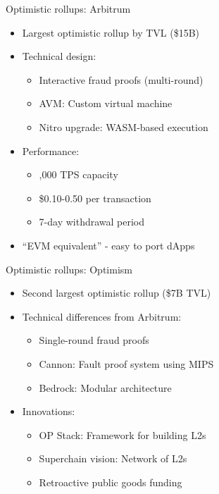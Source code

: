 \documentclass[aspectratio=169, lualatex, handout]{beamer}
\begin{document}
\begin{frame}{Optimistic rollups: Arbitrum}
	\begin{itemize}
		\item Largest optimistic rollup by TVL (\approx\$15B)
		\item Technical design:
		      \begin{itemize}
			      \item Interactive fraud proofs (multi-round)
			      \item AVM: Custom virtual machine
			      \item Nitro upgrade: WASM-based execution
		      \end{itemize}
		\item Performance:
		      \begin{itemize}
			      \item {},000 TPS capacity
			      \item \approx\$0.10-0.50 per transaction
			      \item 7-day withdrawal period
		      \end{itemize}
		\item ``EVM equivalent'' - easy to port dApps
	\end{itemize}
\end{frame}

\begin{frame}{Optimistic rollups: Optimism}
	\begin{itemize}
		\item Second largest optimistic rollup (\approx\$7B TVL)
		\item Technical differences from Arbitrum:
		      \begin{itemize}
			      \item Single-round fraud proofs
			      \item Cannon: Fault proof system using MIPS
			      \item Bedrock: Modular architecture
		      \end{itemize}
		\item Innovations:
		      \begin{itemize}
			      \item OP Stack: Framework for building L2s
			      \item Superchain vision: Network of L2s
			      \item Retroactive public goods funding
		      \end{itemize}
	\end{itemize}
\end{frame}
\end{document}
